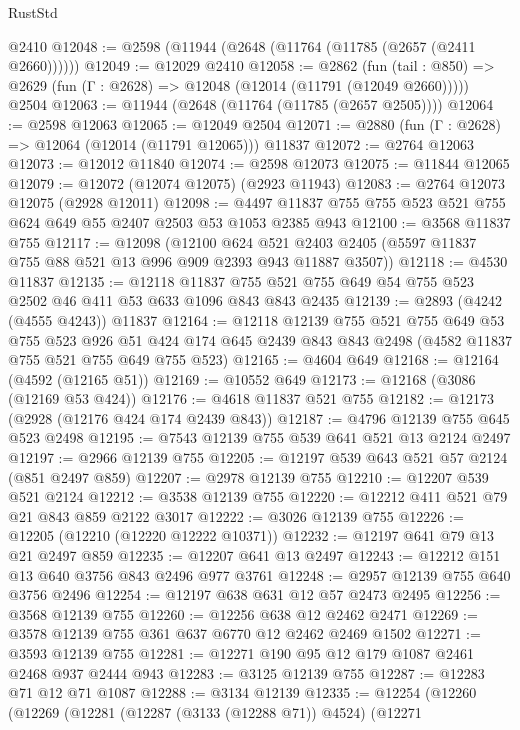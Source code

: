 \begin{lexlean}{RustStd}
\begin{coremodule}
    @2410
@12048 := @2598 (@11944 (@2648 (@11764 (@11785 (@2657 (@2411 @2660))))))
@12049 := @12029 @2410
@12058 := @2862
    (fun (tail : @850) => @2629 (fun (Γ : @2628) => @12048 (@12014 (@11791 (@12049 @2660)))))
    @2504
@12063 := @11944 (@2648 (@11764 (@11785 (@2657 @2505))))
@12064 := @2598 @12063
@12065 := @12049 @2504
@12071 := @2880 (fun (Γ : @2628) => @12064 (@12014 (@11791 @12065))) @11837
@12072 := @2764 @12063
@12073 := @12012 @11840
@12074 := @2598 @12073
@12075 := @11844 @12065
@12079 := @12072 (@12074 @12075) (@2923 @11943)
@12083 := @2764 @12073 @12075 (@2928 @12011)
@12098 := @4497 @11837 @755 @755 @523 @521 @755 @624 @649 @55 @2407 @2503 @53 @1053 @2385 @943
@12100 := @3568 @11837 @755
@12117 := @12098
    (@12100
      @624
      @521
      @2403
      @2405
      (@5597 @11837 @755 @88 @521 @13 @996 @909 @2393 @943 @11887 @3507))
@12118 := @4530 @11837
@12135 := @12118
    @11837
    @755
    @521
    @755
    @649
    @54
    @755
    @523
    @2502
    @46
    @411
    @53
    @633
    @1096
    @843
    @843
    @2435
@12139 := @2893 (@4242 (@4555 @4243)) @11837
@12164 := @12118
    @12139
    @755
    @521
    @755
    @649
    @53
    @755
    @523
    @926
    @51
    @424
    @174
    @645
    @2439
    @843
    @843
    @2498
    (@4582 @11837 @755 @521 @755 @649 @755 @523)
@12165 := @4604 @649
@12168 := @12164 (@4592 (@12165 @51))
@12169 := @10552 @649
@12173 := @12168 (@3086 (@12169 @53 @424))
@12176 := @4618 @11837 @521 @755
@12182 := @12173 (@2928 (@12176 @424 @174 @2439 @843))
@12187 := @4796 @12139 @755 @645 @523 @2498
@12195 := @7543 @12139 @755 @539 @641 @521 @13 @2124 @2497
@12197 := @2966 @12139 @755
@12205 := @12197 @539 @643 @521 @57 @2124 (@851 @2497 @859)
@12207 := @2978 @12139 @755
@12210 := @12207 @539 @521 @2124
@12212 := @3538 @12139 @755
@12220 := @12212 @411 @521 @79 @21 @843 @859 @2122 @3017
@12222 := @3026 @12139 @755
@12226 := @12205 (@12210 (@12220 @12222 @10371))
@12232 := @12197 @641 @79 @13 @21 @2497 @859
@12235 := @12207 @641 @13 @2497
@12243 := @12212 @151 @13 @640 @3756 @843 @2496 @977 @3761
@12248 := @2957 @12139 @755 @640 @3756 @2496
@12254 := @12197 @638 @631 @12 @57 @2473 @2495
@12256 := @3568 @12139 @755
@12260 := @12256 @638 @12 @2462 @2471
@12269 := @3578 @12139 @755 @361 @637 @6770 @12 @2462 @2469 @1502
@12271 := @3593 @12139 @755
@12281 := @12271 @190 @95 @12 @179 @1087 @2461 @2468 @937 @2444 @943
@12283 := @3125 @12139 @755
@12287 := @12283 @71 @12 @71 @1087
@12288 := @3134 @12139
@12335 := @12254
    (@12260
      (@12269
        (@12281
          (@12287 (@3133 (@12288 @71)) @4524)
          (@12271

\end{coremodule}
\end{lexlean}
